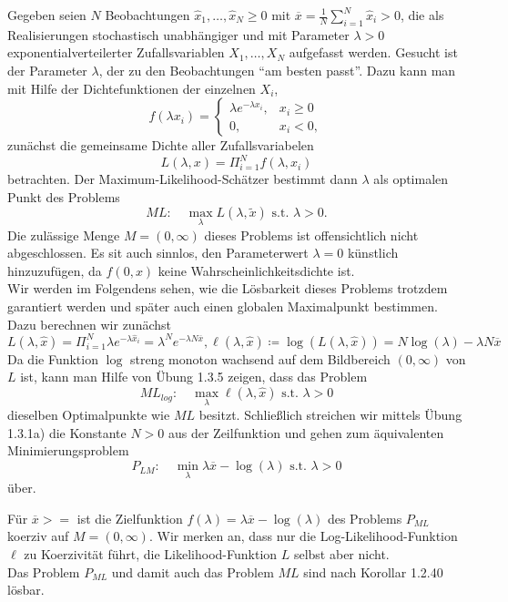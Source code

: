 \documentclass[12pt]{extreport} %
\theoremstyle{named}
\theoremstyle{nnamed}
\theoremstyle{itshape}
\theoremstyle{normal}
\begin{document}
\begin{beispiel}[1.2.36, 1.2.38]
	Gegeben seien $N$ Beobachtungen $\hat{x}_1, \dotsc, \hat{x}_N \geq 0$ mit $\overline{x} = \frac{1}{N} \sum_{i=1}^{N} \hat{x}_i > 0$, die als Realisierungen stochastisch unabhängiger und mit Parameter $\lambda > 0$ exponentialverteilerter Zufallsvariablen $X_1, \dotsc, X_N$ aufgefasst werden. Gesucht ist der Parameter $\lambda$, der zu den Beobachtungen \enquote{am besten passt}. Dazu kann man mit Hilfe der Dichtefunktionen der einzelnen $X_i$,
	$$ f(\lambda x_i) = \begin{cases}
		\lambda e^{-\lambda x_i}, & x_i \geq 0 \\ 0, & x_i < 0,
	\end{cases} $$
	zunächst die gemeinsame Dichte aller Zufallsvariabelen
	$$ L(\lambda, x) = \Pi_{i=1}^{N} f(\lambda, x_i) $$
	betrachten. Der Maximum-Likelihood-Schätzer bestimmt dann $\lambda$ als optimalen Punkt des Problems
	$$ ML: \quad \max_{\lambda} L(\lambda, \tilde{x}) \text{ s.t. } \lambda > 0. $$
	Die zulässige Menge $M = (0, \infty)$ dieses Problems ist offensichtlich nicht abgeschlossen. Es sit auch sinnlos, den Parameterwert $\lambda = 0$ künstlich hinzuzufügen, da $f(0, x)$ keine Wahrscheinlichkeitsdichte ist. ~\\
	
	Wir werden im Folgendens sehen, wie die Lösbarkeit dieses Problems trotzdem garantiert werden und später auch einen globalen Maximalpunkt bestimmen. Dazu berechnen wir zunächst
	$$ L(\lambda, \hat{x}) = \Pi_{i=1}^{N} \lambda e^{-\lambda \hat{x}_i} = \lambda^N e^{-\lambda N \overline{x}}, \ell(\lambda, \hat{x}) \coloneqq \log(L(\lambda, \hat{x})) = N \log(\lambda) - \lambda N \overline{x} $$
	Da die Funktion $\log$ streng monoton wachsend auf dem Bildbereich $(0, \infty)$ von $L$ ist, kann man Hilfe von Übung 1.3.5 zeigen, dass das Problem
	$$ ML_{log}: \quad \max_\lambda \ell(\lambda, \hat{x}) \text{ s.t. } \lambda > 0 $$
	dieselben Optimalpunkte wie $ML$ besitzt. Schließlich streichen wir mittels Übung 1.3.1a) die Konstante $N > 0$ aus der Zeilfunktion und gehen zum äquivalenten Minimierungsproblem
	$$ P_{LM}: \quad \min_\lambda \lambda \overline{x} - \log(\lambda) \text{ s.t. } \lambda > 0 $$
	über.
	

	Für $\overline{x} > =$ ist die Zielfunktion $f(\lambda) = \lambda \overline{x} - \log(\lambda)$ des Problems $P_{ML}$ koerziv auf $M = (0, \infty)$. Wir merken an, dass nur die Log-Likelihood-Funktion $\ell$ zu Koerzivität führt, die Likelihood-Funktion $L$ selbst aber nicht. ~\\
	
	Das Problem $P_{ML}$ und damit auch das Problem $ML$ sind nach Korollar 1.2.40 lösbar.
\end{beispiel}
\end{document}
